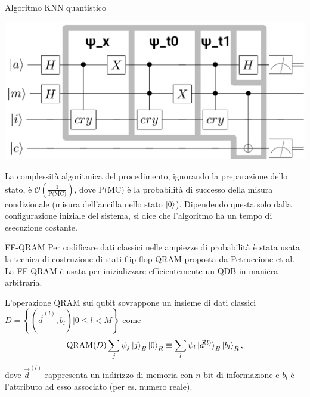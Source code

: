 \documentclass{beamer}
\begin{document}
    \begin{frame}{Algoritmo KNN quantistico}
        \begin{center}
            \includegraphics[width=.8\textwidth]{gfx/qknn_boxes.png}            
        \end{center}

        La complessità algoritmica del procedimento, ignorando la preparazione dello 
        stato, è $\mathcal{O}\left(\frac{1}{\text{P(MC)}}\right)$, 
        dove $\text{P(MC)}$ è la probabilità di successo della misura condizionale 
        (misura dell'ancilla nello stato $\ket{0}$). 
        Dipendendo questa solo dalla configurazione iniziale del sistema, si 
        dice che l'algoritmo ha un tempo di esecuzione costante. \cite{fingerhuth}
    \end{frame}

    \begin{frame}{FF-QRAM}
        Per codificare dati classici nelle ampiezze di probabilità è stata usata la tecnica di costruzione 
        di stati flip-flop QRAM proposta da Petruccione et al. \cite{petruccione}
        La FF-QRAM è usata per inizializzare efficientemente un QDB in maniera arbitraria. 

        L'operazione QRAM sui qubit sovrappone un insieme di dati classici 
        $D = \left\{ \left( \vec{d}^{(l)}, b_l \right) \Big| 0 \leq l < M \right\}$ come
        \begin{equation*} \label{eq:qram}
            \text{QRAM}(D) \sum_j \psi_j \ket{j}_B \ket{0}_R \equiv 
            \sum_l \psi_l \ket{\vec{d}^{(l)}}_B \ket{b_l}_R,
        \end{equation*}
        dove $\vec{d}^{(l)}$ rappresenta un indirizzo di memoria con 
        $n$ bit di informazione 
        e $b_l$ è l'attributo ad esso associato (per es. numero reale). 
    \end{frame}
\end{document}
